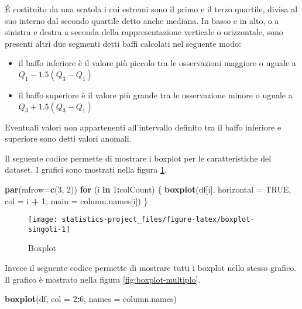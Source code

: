 \documentclass[]{book}
\newenvironment{Shaded}{\begin{snugshade}}{\end{snugshade}}
\newcommand{\KeywordTok}[1]{\textcolor[rgb]{0.13,0.29,0.53}{\textbf{#1}}}
\newcommand{\DataTypeTok}[1]{\textcolor[rgb]{0.13,0.29,0.53}{#1}}
\newcommand{\DecValTok}[1]{\textcolor[rgb]{0.00,0.00,0.81}{#1}}
\newcommand{\StringTok}[1]{\textcolor[rgb]{0.31,0.60,0.02}{#1}}
\newcommand{\OtherTok}[1]{\textcolor[rgb]{0.56,0.35,0.01}{#1}}
\newcommand{\ControlFlowTok}[1]{\textcolor[rgb]{0.13,0.29,0.53}{\textbf{#1}}}
\newcommand{\OperatorTok}[1]{\textcolor[rgb]{0.81,0.36,0.00}{\textbf{#1}}}
\newcommand{\NormalTok}[1]{#1}
\begin{document}
É costituito da una scatola i cui estremi sono il primo e il terzo
quartile, divisa al suo interno dal secondo quartile detto anche
mediana. In basso e in alto, o a sinistra e destra a seconda della
rappresentazione verticale o orizzontale, sono presenti altri due
segmenti detti baffi calcolati nel seguente modo:

\begin{itemize}
\item
  il baffo inferiore è il valore più piccolo tra le osservazioni
  maggiore o uguale a \(Q_1 − 1.5(Q_3 − Q_1)\)
\item
  il baffo superiore è il valore più grande tra le osservazione minore o
  uguale a \(Q_3 + 1.5(Q_3 − Q_1)\)
\end{itemize}

Eventuali valori non appartenenti all'intervallo definito tra il baffo
inferiore e superiore sono detti valori anomali.

Il seguente codice permette di mostrare i boxplot per le caratteristiche
del dataset. I grafici sono mostrati nella figura
\ref{fig:boxplot-singoli}.

\begin{Shaded}
\begin{Highlighting}[]
\KeywordTok{par}\NormalTok{(}\DataTypeTok{mfrow=}\KeywordTok{c}\NormalTok{(}\DecValTok{3}\NormalTok{, }\DecValTok{2}\NormalTok{))}
\ControlFlowTok{for}\NormalTok{ (i }\ControlFlowTok{in} \DecValTok{1}\OperatorTok{:}\NormalTok{colCount) \{}
  \KeywordTok{boxplot}\NormalTok{(df[i], }\DataTypeTok{horizontal =} \OtherTok{TRUE}\NormalTok{, }\DataTypeTok{col =}\NormalTok{ i }\OperatorTok{+}\StringTok{ }\DecValTok{1}\NormalTok{, }\DataTypeTok{main =}\NormalTok{ column.names[i])}
\NormalTok{\}}
\end{Highlighting}
\end{Shaded}

\begin{figure}

{\centering \texttt{[image: statistics-project\_files/figure-latex/boxplot-singoli-1]} 

}

\caption{Boxplot}\label{fig:boxplot-singoli}
\end{figure}

Invece il seguente codice permette di mostrare tutti i boxplot nello
stesso grafico. Il grafico è mostrato nella figura
\ref{fig:boxplot-multiplo}.

\begin{Shaded}
\begin{Highlighting}[]
  \KeywordTok{boxplot}\NormalTok{(df, }\DataTypeTok{col =} \DecValTok{2}\OperatorTok{:}\DecValTok{6}\NormalTok{, }\DataTypeTok{names =}\NormalTok{ column.names)}
\end{Highlighting}
\end{Shaded}
\end{document}
